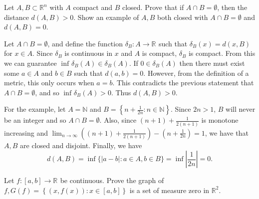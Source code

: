 
\begin{problem}{1}
  Let $A,B \subset \mathbb{R}^{n}$ with $A$ compact and $B$ closed. Prove that if $A \cap B = \emptyset$, then the distance $d(A,B) > 0$.
  Show an example of $A,B$ both closed with $A \cap B = \emptyset$ and $d(A,B) = 0$.
\end{problem} 

\begin{solution}

  Let $A \cap B = \emptyset$, and define the function $ \delta_{B} : A \to \mathbb{R}^{} $ such that $\delta_{B}(x) = d(x,B)$ for $x \in A$.
  Since $\delta_{B}$ is continuous in $x$ and $A$ is compact, $\delta_{B}$ is compact.
  From this we can guarantee $\inf_{}\delta_{B}(A) \in \delta_{B}(A)$.
  If $0 \in \delta_{B}(A)$ then there must exist some $a \in A$ and $b \in B$ such that $d(a,b) = 0$.
  However, from the definition of a metric, this only occurs when $a = b$.
  This contradicts the previous statement that $A \cap B = \emptyset$, and so $ \inf_{}\delta_{B}(A) > 0$.
  Thus $d(A,B) > 0$.

  For the example, let $A = \mathbb{N}$ and $B = \left\{ n + \frac{1}{2n} : n \in \mathbb{N} \right\}$.
  Since $2n > 1$, $B$ will never be an integer and so $A \cap B = \emptyset$.
  Also, since $(n+1) + \frac{1}{2(n+1)}$ is monotone increasing and $\lim_{n\to \infty} ((n+1) + \frac{1}{2(n+1)}) - (n + \frac{1}{2n}) = 1$, we have that $A,B$ are closed and disjoint.
  Finally, we have
  \[
  d(A,B) = \inf\{\left| a - b \right| : a \in A, b \in B\} = \inf\left| \frac{1}{2n} \right| = 0
  .\] 

\end{solution}

\begin{problem}{2}
  Let $ f : [a,b] \to \mathbb{R}^{} $ be continuous. Prove the graph of $f, G(f) = \left\{ (x,f(x)) : x \in [a,b] \right\}$ is a set of measure zero in $\mathbb{R}^{2}$.
\end{problem}
    
